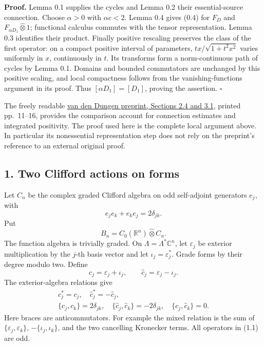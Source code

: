 \documentclass[
  11pt,
]{article}
\begin{document}
\textbf{Proof.} Lemma 0.1 supplies the cycles and Lemma 0.2 their
essential-source connection. Choose \(\alpha>0\) with \(\alpha c<2\).
Lemma 0.4 gives (0.4) for \(F_D\) and
\(F_{\alpha D_1}\widehat\otimes1\); functional calculus commutes with
the tensor representation. Lemma 0.3 identifies their product. Finally
positive rescaling preserves the class of the first operator: on a
compact positive interval of parameters, \(tx/\sqrt{1+t^2x^2}\) varies
uniformly in \(x\), continuously in \(t\). Its transforms form a
norm-continuous path of cycles by Lemma 0.1. Domains and bounded
commutators are unchanged by this positive scaling, and local
compactness follows from the vanishing-functions argument in its proof.
Thus \([\alpha D_1]=[D_1]\), proving the assertion. \(\square\)

The freely readable \href{https://arxiv.org/pdf/2006.10616v2}{van den
Dungen preprint, Sections 2.4 and 3.1}, printed pp.~11--16, provides the
comparison account for connection estimates and integrated positivity.
The proof used here is the complete local argument above. In particular
its nonessential representation step does not rely on the preprint's
reference to an external original proof.

\subsection{1. Two Clifford actions on
forms}\label{two-clifford-actions-on-forms}

Let \(C_n\) be the complex graded Clifford algebra on odd self-adjoint
generators \(e_j\), with \[
e_je_k+e_ke_j=2\delta_{jk}.
\] Put \[
B_n=C_0(\mathbb R^n)\widehat\otimes C_n.
\] The function algebra is trivially graded. On
\(\Lambda=\Lambda^*\mathbb C^n\), let \(\varepsilon_j\) be exterior
multiplication by the \(j\)-th basis vector and let
\(\iota_j=\varepsilon_j^*\). Grade forms by their degree modulo two.
Define \[
c_j=\varepsilon_j+\iota_j,\qquad
\widehat c_j=\varepsilon_j-\iota_j.
\tag{1.1}
\] The exterior-algebra relations give \[
\begin{gathered}
c_j^*=c_j,\quad \widehat c_j^*=-\widehat c_j,\\
\{c_j,c_k\}=2\delta_{jk},\quad
\{\widehat c_j,\widehat c_k\}=-2\delta_{jk},\quad
\{c_j,\widehat c_k\}=0 .
\end{gathered}
\tag{1.2}
\] Here braces are anticommutators. For example the mixed relation is
the sum of \(\{\varepsilon_j,\varepsilon_k\}\),
\(-\{\iota_j,\iota_k\}\), and the two cancelling Kronecker terms. All
operators in (1.1) are odd.
\end{document}
